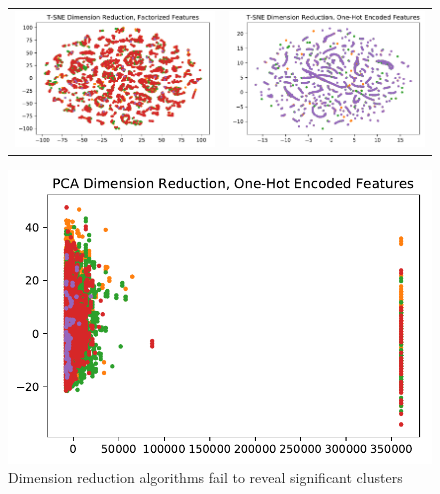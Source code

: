 \documentclass[11pt]{article}
\begin{document}
\begin{figure}
\begin{tabular}{c c}
            \includegraphics[scale=.5]{images/TSNE1.pdf} & \includegraphics[scale=.5]{images/TSNE2.pdf}
        \end{tabular}
        \includegraphics[scale=.5]{images/PCA.pdf}
        \caption{Dimension reduction algorithms fail to reveal significant clusters}
        \label{fig:my_label}
    \end{figure}
    { \hspace*{\fill} \\}
    
\end{document}
